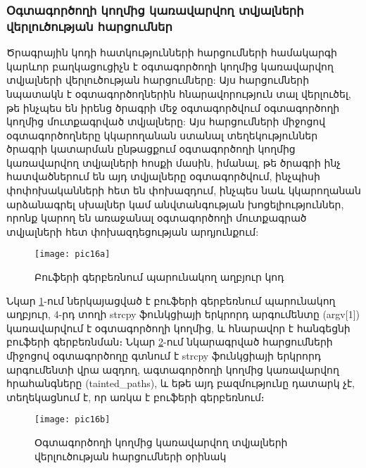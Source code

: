 \subsubsection*{Օգտագործողի կողմից կառավարվող տվյալների վերլուծության հարցումներ}\label{subsubsec:taintAnalisys}
Ծրագրային կոդի հատկությունների հարցումների համակարգի կարևոր բաղկացուցիչն է օգտագործողի կողմից կառավարվող տվյալների վերլուծության հարցումները:
Այս հարցումների նպատակն է օգտագործողներին հնարավորություն տալ վերլուծել, թե ինչպես են իրենց ծրագրի մեջ օգտագործվում
օգտագործողի կողմից մուտքագրված տվյալները:
Այս հարցումների միջոցով օգտագործողները կկարողանան ստանալ տեղեկություններ ծրագրի կատարման ընթացքում օգտագործողի կողմից
կառավարվող տվյալների հոսքի մասին, իմանալ, թե ծրագրի ինչ հատվածներում են այդ տվյալները օգտագործվում, ինչպիսի փոփոխականների
հետ են փոխազդում, ինչպես նաև կկարողանան արձանագրել սխալներ կամ անվտանգության խոցելիություններ, որոնք կարող են առաջանալ օգտագործողի
մուտքագրած տվյալների հետ փոխազդեցության արդյունքում:

\begin{figure}[h]
    \centering
    \texttt{[image: pic16a]}
    \caption{Բուֆերի գերբեռնում պարունակող աղբյուր կոդ}
    \label{fig:figure16a}
\end{figure}

Նկար \ref{fig:figure16a}-ում ներկայացված է բուֆերի գերբեռնում պարունակող աղբյուր, 4-րդ տողի strcpy ֆունկցիայի երկրորդ արգումենտը (argv[1])
կառավարվում է օգտագործողի կողմից, և հնարավոր է հանգեցնի բուֆերի գերբեռնման։
Նկար \ref{fig:figure16b}-ում նկարագրված հարցումների միջոցով օգտագործողը գտնում է strcpy ֆունկցիայի երկրորդ արգումենտի վրա ազդող, ագտագործողի կողմից
կառավարվող հրահանգները (tainted\_paths), և եթե այդ բազմությունը դատարկ չէ, տեղեկացնում է, որ առկա է բուֆերի գերբեռնում։

\begin{figure}[h]
    \centering
    \texttt{[image: pic16b]}
    \caption{Օգտագործողի կողմից կառավարվող տվյալների վերլուծության հարցումների օրինակ}
    \label{fig:figure16b}
\end{figure}
